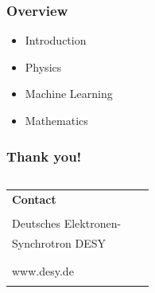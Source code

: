 \begin{frame}
\frametitle{Overview}
  \begin{itemize}[<+->]
      \item {Introduction}
      \item {Physics}
      \item {Machine Learning}
      \item {Mathematics}
  \end{itemize}
\end{frame}






\begin{frame}
\frametitle{Thank you!}
\vfill{}
\vspace*{3.5cm}


\fontsize{8}{9}\selectfont
\begin{columns}
	\hspace*{-0.8em}
	\hspace*{-1em}  %
	\begin{column}{\textwidth}
		\begin{tabular}{lll}
		\textbf{Contact}&\hspace*{0.5cm} & \\
						&\hspace*{0.5cm} & \\
		\hspace*{-0.4mm}Deutsches Elektronen-&\hspace*{0.5cm} & \AUTHOR\\
		\hspace*{-0.4mm}Synchrotron DESY&\hspace*{0.5cm} & \ORCiD{\ORCID}\\
							&\hspace*{0.5cm} & \GROUP\\
							&\hspace*{0.5cm} & \MailTo{\EMAIL}\\
		\hspace*{-0.4mm}www.desy.de			&\hspace*{0.5cm} & \PHONE\\
							&\hspace*{0.5cm} & \DOIlink{\DOI}\\
		\end{tabular}
	\end{column}
\end{columns}


\end{frame}


